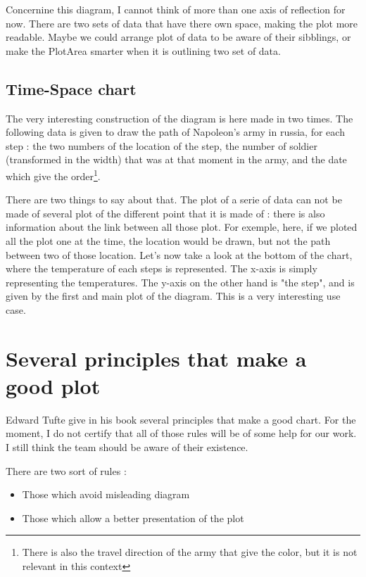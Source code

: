 Concernine this diagram, I cannot think of more than one axis of reflection for now. There are two sets of data that have there own space, making the plot more readable. Maybe we could arrange plot of data to be aware of their sibblings, or make the PlotArea smarter when it is outlining two set of data.


\subsection{Time-Space chart}
The very interesting construction of the diagram is here made in two times. The following data is given to draw the path of Napoleon's army in russia, for each step : the two numbers of the location of the step, the number of soldier (transformed in the width) that was at that moment in the army, and the date which give the order\footnote{There is also the travel direction of the army that give the color, but it is not relevant in this context}.

There are two things to say about that. The plot of a serie of data can not be made of several plot of the different point that it is made of : there is also information about the link between all those plot. For exemple, here, if we ploted all the plot one at the time, the location would be drawn, but not the path between two of those location.
Let's now take a look at the bottom of the chart, where the temperature of each steps is represented. The x-axis is simply representing the temperatures. The y-axis on the other hand is "the step", and is given by the first and main plot of the diagram. This is a very interesting use case.

\section{Several principles that make a good plot}
Edward Tufte give in his book several principles that make a good chart. For the moment, I do not certify that all of those rules will be of some help for our work. I still think the team should be aware of their existence.

There are two sort of rules :
\begin{itemize}
\item Those which avoid misleading diagram  
\item Those which allow a better presentation of the plot
\end{itemize}

